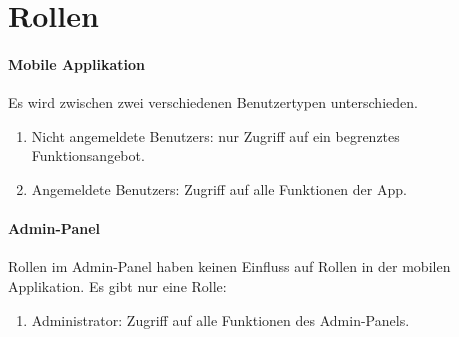 \section{Rollen}

\paragraph{Mobile Applikation}
Es wird zwischen zwei verschiedenen \Gls{Benutzer}typen unterschieden.
\begin{enumerate}
    \item Nicht angemeldete \Glspl{Benutzer}: nur Zugriff auf ein begrenztes Funktionsangebot.
    \item Angemeldete \Glspl{Benutzer}: Zugriff auf alle Funktionen der App.
\end{enumerate}

\paragraph{Admin-Panel}
Rollen im \Gls{Admin-Panel} haben keinen Einfluss auf Rollen in der mobilen Applikation.
Es gibt nur eine Rolle:
\begin{enumerate}
    \item \Gls{Administrator}: Zugriff auf alle Funktionen des \Gls{Admin-Panel}s.
\end{enumerate}
